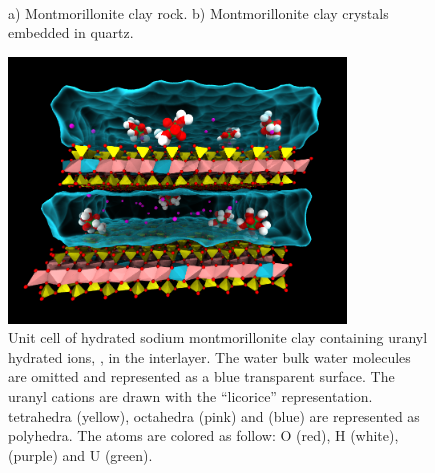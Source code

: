 \begin{figure}
     \centering
     \\
     \caption[Montmorillonite clay minerals]{a) Montmorillonite clay rock. b) Montmorillonite 
clay crystals embedded in quartz.\cite{MMT_mac1,MMT_mac2}}
     \label{clay}
\end{figure}


\begin{figure}
     \centering
         \includegraphics[width=0.8\textwidth]{images/clay} 
        \caption[Hydrated montmorillonite clay containing uranyl cations]{Unit cell of hydrated 
sodium montmorillonite clay containing uranyl hydrated ions, , in the 
interlayer. The water bulk water molecules are omitted and represented as a blue transparent 
surface. The uranyl cations are drawn with the ``licorice'' representation.  tetrahedra 
(yellow),  octahedra (pink) and  (blue) are represented as polyhedra. The atoms 
are colored as follow: O (red), H (white),  (purple) and U (green). }
        \label{clay2}
\end{figure}

